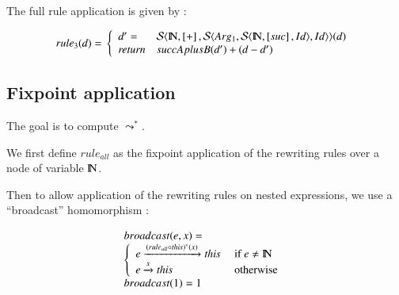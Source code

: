 The full rule application is given by :

$$
rule_3 (d) =  \\
\left\{\begin{array}{ll}
d' = &  {\cal S}\langle {\mbox{${\rm I\!N}$},\left[+\right],{\cal S}\ensuremath{\langle {Arg_1,{\cal S}\ensuremath{\langle {\mbox{${\rm I\!N}$},\left[suc\right],Id} \rangle},Id} \rangle}} \rangle (d) \\
\mathit{return} &  succAplusB (d') + (d-d')
 \end{array}
\right. \\
$$



\subsection{Fixpoint application}

The goal is to compute $\leadsto^*$.

We first define $rule_{all}$ as the fixpoint application of the rewriting rules over a node of variable $\mbox{${\rm I\!N}$}$.

Then to allow application of the rewriting rules on nested expressions, we use a ``broadcast'' homomorphism : 

$$
\begin{array}{lcl}
{broadcast} (e,x)= \\
\left\{\begin{array}{ll}
e \xrightarrow{\scriptstyle {(rule_{all} \circ \mathit{this} )^* ( x )}}   \mathit{this} & \mbox{ if } e \neq \mbox{${\rm I\!N}$} \\
e \xrightarrow{\scriptstyle {x}} \mathit{this} & \mbox{ otherwise } \\
\end{array}
\right. \\
{broadcast}  (1) = 1 
\end{array}
$$

